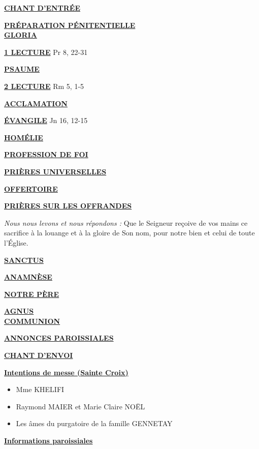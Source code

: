 \documentclass[french,11pt,a4paper]{article}
\newcommand*{\chants}{../chants}
\newcommand*{\messe}{../messe_bienveillance}
\newcommand*{\pu}{../pu}
\newcommand*{\psaumes}{../psaumes}
\newcommand{\NewsItem}[1]{%
\vspace{3pt}
\underline{\textbf{#1}}
		  }
\begin{document}
\NewsItem{CHANT D'ENTRÉE}
	

\NewsItem{PRÉPARATION PÉNITENTIELLE} \\
	

\NewsItem{GLORIA}
	


\NewsItem{1\iere{} LECTURE} Pr 8, 22-31

\NewsItem{PSAUME}


\NewsItem{2\ieme{} LECTURE} Rm 5, 1-5

\NewsItem{ACCLAMATION}
%

\NewsItem{ÉVANGILE} Jn 16, 12-15

\NewsItem{HOMÉLIE}

\NewsItem{PROFESSION DE FOI}


\NewsItem{PRIÈRES UNIVERSELLES} 


\NewsItem{OFFERTOIRE}

\NewsItem{PRIÈRES SUR LES OFFRANDES}
\textit{Nous nous levons et nous répondons : }
Que le Seigneur reçoive de vos mains ce sacrifice à la louange et à la gloire 
de Son nom, pour notre bien et celui de toute l’Église.

\NewsItem{SANCTUS}


\NewsItem{ANAMNÈSE}


\NewsItem{NOTRE PÈRE}

\NewsItem{AGNUS} \\


\NewsItem{COMMUNION}


\NewsItem{ANNONCES PAROISSIALES}

\NewsItem{CHANT D'ENVOI}


\newpage


\NewsItem{Intentions de messe (Sainte Croix)}
\begin{itemize}
\item[\Cross] Mme KHELIFI
\item[\Cross]
Raymond MAIER et Marie Claire NOËL
\item[\Cross]
Les âmes du purgatoire de la famille GENNETAY
\end{itemize}

\NewsItem{Informations paroissiales}
\end{document}
